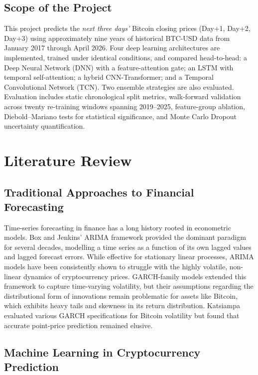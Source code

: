 \documentclass[12pt]{article}
\begin{document}
\subsection{Scope of the Project}

This project predicts the \emph{next three days'} Bitcoin closing prices (Day+1, Day+2, Day+3) using approximately nine years of historical BTC-USD data from January 2017 through April 2026. Four deep learning architectures are implemented, trained under identical conditions, and compared head-to-head: a Deep Neural Network (DNN) with a feature-attention gate; an LSTM with temporal self-attention; a hybrid CNN-Transformer; and a Temporal Convolutional Network (TCN). Two ensemble strategies are also evaluated. Evaluation includes static chronological split metrics, walk-forward validation across twenty re-training windows spanning 2019--2025, feature-group ablation, Diebold--Mariano tests for statistical significance, and Monte Carlo Dropout uncertainty quantification.

\section{Literature Review}

\subsection{Traditional Approaches to Financial Forecasting}

Time-series forecasting in finance has a long history rooted in econometric models. Box and Jenkins' ARIMA framework \cite{box2015} provided the dominant paradigm for several decades, modelling a time series as a function of its own lagged values and lagged forecast errors. While effective for stationary linear processes, ARIMA models have been consistently shown to struggle with the highly volatile, non-linear dynamics of cryptocurrency prices. GARCH-family models extended this framework to capture time-varying volatility, but their assumptions regarding the distributional form of innovations remain problematic for assets like Bitcoin, which exhibits heavy tails and skewness in its return distribution. Katsiampa \cite{katsiampa2017} evaluated various GARCH specifications for Bitcoin volatility but found that accurate point-price prediction remained elusive.

\subsection{Machine Learning in Cryptocurrency Prediction}
\end{document}
